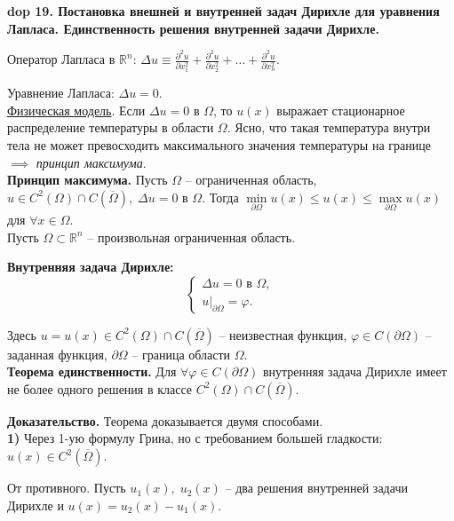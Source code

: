 \textbf{\LARGE dop 19. Постановка внешней и внутренней задач Дирихле для уравнения Лапласа. Единственность решения внутренней задачи Дирихле.}

Оператор Лапласа в $\mathbb{R}^n$: $\Delta u \equiv \frac{\partial^2 u}{\partial x_1^2} + \frac{\partial^2 u}{\partial x_2^2} + \ldots + \frac{\partial^2 u}{\partial x_n^2}$.

Уравнение Лапласа: $\Delta u = 0$.\\

\underline{Физическая модель}. Если $\Delta u = 0$ в $\Omega$, то $u(x)$ выражает стационарное распределение
температуры в области $\Omega$. Ясно, что такая температура внутри тела не может превосходить максимального значения температуры на границе $\implies$ \textit{принцип максимума}.\\

\textbf{Принцип максимума.} Пусть $\Omega$ -- ограниченная область, $u \in C^2(\Omega) \cap C(\overline{\Omega}), \; \Delta u = 0$ в $\Omega$. Тогда $\min\limits_{\partial \Omega} u(x) \leq u(x) \leq \max\limits_{\partial \Omega} u(x)$ для $\forall x \in \Omega$. \\

Пусть $\Omega \subset \mathbb{R}^n$ -- произвольная ограниченная область.

\textbf{Внутренняя задача Дирихле:}
\begin{equation*}
    \begin{cases}
    \Delta u = 0 \text{ в } \Omega, \\
    u |_{\partial \Omega} = \varphi.
    \end{cases}
\end{equation*}

Здесь $u = u(x) \in C^2(\Omega) \cap C(\overline{\Omega})$ -- неизвестная функция, $\varphi \in C(\partial \Omega)$ -- заданная функция, $\partial \Omega$ -- граница области $\Omega$.
\\

\textbf{Теорема единственности.} Для 
$\forall \varphi \in C(\partial \Omega)$ внутренняя задача Дирихле имеет не более одного решения в классе $C^2(\Omega) \cap C(\overline{\Omega})$.

\textbf{Доказательство.} Теорема доказывается двумя способами.\\

\textbf{1)} Через 1-ую формулу Грина, но с требованием большей гладкости: $u(x) \in C^2(\overline{\Omega})$. 

От противного. Пусть $u_1(x), \; u_2(x)$ -- два решения внутренней задачи Дирихле и $u(x) = u_2(x) - u_1(x)$.

